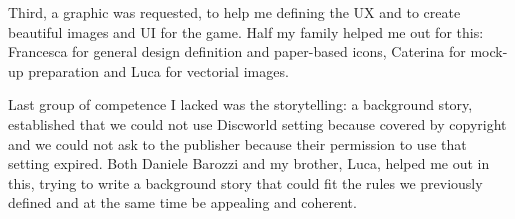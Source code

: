 		Third, a graphic was requested, to help me defining the UX and to create beautiful images and UI for the game. Half my family helped me out for this: Francesca for general design definition and paper-based icons, Caterina for mock-up preparation and Luca for vectorial images.
		
		Last group of competence I lacked was the storytelling: a background story, established that we could not use Discworld setting because covered by copyright and we could not ask to the publisher because their permission to use that setting expired. Both Daniele Barozzi and my brother, Luca, helped me out in this, trying to write a background story that could fit the rules we previously defined and at the same time be appealing and coherent.